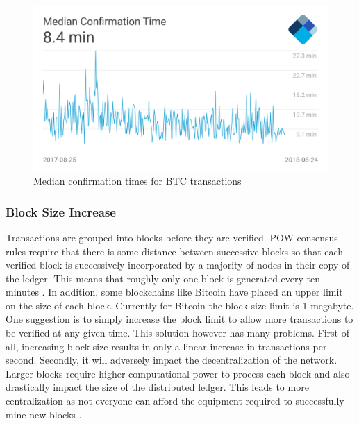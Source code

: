 \begin{figure}[h]
	\centering
    \includegraphics[width=120mm,scale=1]{figs/median-confirmation-time}
	\caption{Median confirmation times for BTC transactions \cite{fig:001}}
	\label{fig:mct}
\end{figure}
\clearpage

\subsubsection{Block Size Increase}
Transactions are grouped into blocks before they are verified. POW consensus rules require that there is some distance between successive blocks so that each verified block is successively incorporated by a majority of nodes in their copy of the ledger. This means that roughly only one block is generated every ten minutes \cite{paper:001}. In addition, some blockchains like Bitcoin have placed an upper limit on the size of each block. Currently for Bitcoin the block size limit is 1 megabyte. One suggestion is to simply increase the block limit to allow more transactions to be verified at any given time.  This solution however has many problems. First of all, increasing block size results in only a linear increase in transactions per second. Secondly, it will adversely impact the decentralization of the network. Larger blocks require higher computational power to process each block and also drastically impact the size of the distributed ledger. This leads to more centralization as not everyone can afford the equipment required to successfully mine new blocks \cite{medium:006}.  
